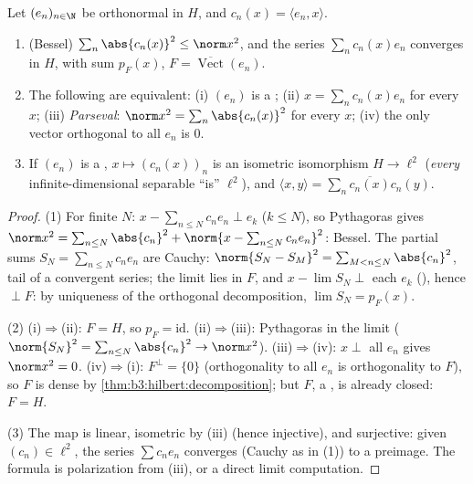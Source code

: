 \begin{theorem}\label{thm:b3:hilbert:parseval}
Let $(e_n)_{n\in\N}$ be orthonormal in $H$, and $c_n(x) =
\langle e_n, x\rangle$.
\begin{enumerate}
  \item (Bessel) $\sum_n\abs{c_n(x)}^2 \leq \norm x^2$, and
        the series $\sum_nc_n(x)e_n$ converges in $H$, with
        sum $p_F(x)$, $F = \overline{\operatorname{Vect}}(e_n)$.
  \item The following are equivalent: (i) $(e_n)$ is a ; (ii) $x = \sum_nc_n(x)e_n$ for every $x$; (iii)
        \emph{Parseval}: $\norm x^2
        = \sum_n\abs{c_n(x)}^2$ for every $x$; (iv) the only
        vector orthogonal to all $e_n$ is $0$.
  \item If $(e_n)$ is a , $x \mapsto (c_n(x))_n$
        is an isometric isomorphism $H \to \ell^2$
        (\emph{every} infinite-dimensional separable  ``is'' $\ell^2$), and $\langle x, y\rangle =
        \sum_n\overline{c_n(x)}c_n(y)$.
\end{enumerate}
\end{theorem}

\begin{proof}
(1) For finite $N$: $x - \sum_{n\leq N}c_ne_n \perp e_k$ ($k
\leq N$), so Pythagoras gives $\norm x^2 = \sum_{n\leq
N}\abs{c_n}^2 + \norm{x - \sum_{n\leq N}c_ne_n}^2$: Bessel.
The partial sums $S_N = \sum_{n\leq N}c_ne_n$ are Cauchy:
$\norm{S_N - S_M}^2 = \sum_{M<n\leq N}\abs{c_n}^2$, tail of a
convergent series; the limit lies in $F$, and $x - \lim S_N
\perp$ each $e_k$ (), hence $\perp F$: by uniqueness
of the orthogonal decomposition, $\lim S_N = p_F(x)$.

(2) (i)$\Rightarrow$(ii): $F = H$, so $p_F = \mathrm{id}$.
(ii)$\Rightarrow$(iii): Pythagoras in the limit ($\norm{S_N}^2
= \sum_{n \leq N}\abs{c_n}^2 \to \norm x^2$).
(iii)$\Rightarrow$(iv): $x \perp$ all $e_n$ gives $\norm x^2 =
0$. (iv)$\Rightarrow$(i): $F^\perp = \{0\}$
(orthogonality to all $e_n$ is orthogonality to $F$), so $F$
is dense by \cref{thm:b3:hilbert:decomposition}; but $F$, a
, is already closed: $F = H$.

(3) The map is linear, isometric by (iii) (hence injective),
and surjective: given $(c_n) \in \ell^2$, the series $\sum
c_ne_n$ converges (Cauchy as in (1)) to a preimage. The  formula is polarization from (iii), or a direct limit
computation.
\end{proof}

